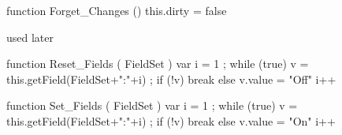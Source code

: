 function Forget_Changes ()
  { this.dirty = false }

\stopJSpreamble

%


% 
% 
% 
% 
% 
%
%

 used later

function Reset_Fields ( FieldSet ) 
  { var i = 1 ; 
    while (true) 
      { v = this.getField(FieldSet+":"+i) ; 
        if (!v) 
          { break }  
        else 
          { v.value = "Off" } 
        i++ } } 

function Set_Fields ( FieldSet ) 
  { var i = 1 ; 
    while (true) 
      { v = this.getField(FieldSet+":"+i) ; 
        if (!v) 
          { break }  
        else 
          { v.value = "On" } 
        i++ } } 

